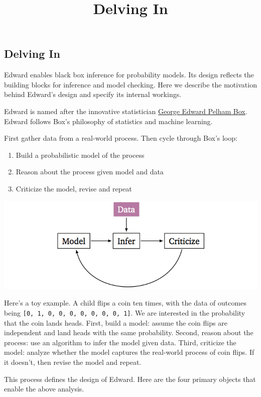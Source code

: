 \title{Delving In}

\subsection{Delving In}

Edward enables black box inference for probability models. Its design reflects
the building blocks for inference and model checking. Here we describe the
motivation behind Edward's design and specify its internal workings.

Edward is named after the innovative statistician
\href{https://en.wikipedia.org/wiki/George_E._P._Box}{George Edward
Pelham Box}. Edward follows Box's philosophy of statistics and machine
learning.

First gather data from a real-world process. Then cycle through Box's
loop:

\begin{enumerate}
\item Build a probabilistic model of the process
\item Reason about the process given model and data
\item Criticize the model, revise and repeat
\end{enumerate}

\hspace*{100px}\includegraphics{images/model_infer_criticize.png}

Here's a toy example. A child flips a coin ten times, with the data of
outcomes being \texttt{{[}0,\ 1,\ 0,\ 0,\ 0,\ 0,\ 0,\ 0,\ 0,\ 1{]}}. We
are interested in the probability that the coin lands heads. First,
build a model: assume the coin flips are independent and land heads with
the same probability. Second, reason about the process: use an algorithm
to infer the model given data. Third, criticize the model: analyze
whether the model captures the real-world process of coin flips. If it
doesn't, then revise the model and repeat.

This process defines the design of Edward. Here are the four
primary objects that enable the above analysis. 

